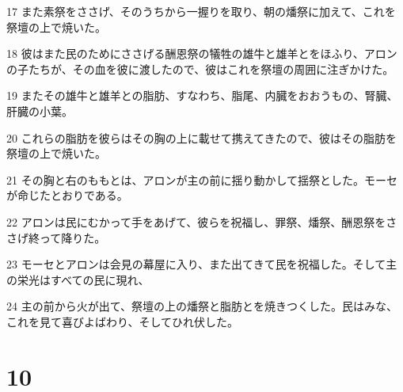 \par 17 また素祭をささげ、そのうちから一握りを取り、朝の燔祭に加えて、これを祭壇の上で焼いた。
\par 18 彼はまた民のためにささげる酬恩祭の犠牲の雄牛と雄羊とをほふり、アロンの子たちが、その血を彼に渡したので、彼はこれを祭壇の周囲に注ぎかけた。
\par 19 またその雄牛と雄羊との脂肪、すなわち、脂尾、内臓をおおうもの、腎臓、肝臓の小葉。
\par 20 これらの脂肪を彼らはその胸の上に載せて携えてきたので、彼はその脂肪を祭壇の上で焼いた。
\par 21 その胸と右のももとは、アロンが主の前に揺り動かして揺祭とした。モーセが命じたとおりである。
\par 22 アロンは民にむかって手をあげて、彼らを祝福し、罪祭、燔祭、酬恩祭をささげ終って降りた。
\par 23 モーセとアロンは会見の幕屋に入り、また出てきて民を祝福した。そして主の栄光はすべての民に現れ、
\par 24 主の前から火が出て、祭壇の上の燔祭と脂肪とを焼きつくした。民はみな、これを見て喜びよばわり、そしてひれ伏した。

\chapter{10}

